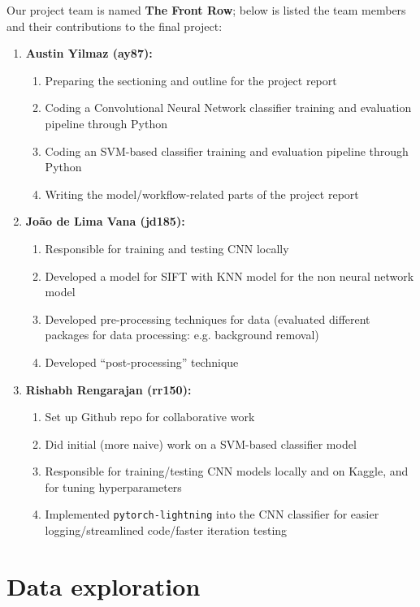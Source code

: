 \documentclass[10pt]{article} %
\begin{document}
Our project team is named \textbf{The Front Row}; below is listed the team members and their contributions to the final project:
\begin{enumerate}
  \item \textbf{Austin Yilmaz (ay87):}
    \begin{enumerate}
      \item Preparing the sectioning and outline for the project report
      \item Coding a Convolutional Neural Network classifier training and evaluation pipeline through Python
      \item Coding an SVM-based classifier training and evaluation pipeline through Python
      \item Writing the model/workflow-related parts of the project report
    \end{enumerate}
  \item \textbf{João de Lima Vana (jd185):}
    \begin{enumerate}
      \item Responsible for training and testing CNN locally
      \item Developed a model for SIFT with KNN model for the non neural network model
      \item Developed pre-processing techniques for data (evaluated different packages for data processing: e.g. background removal)
      \item Developed ``post-processing'' technique
    \end{enumerate}
  \item \textbf{Rishabh Rengarajan (rr150):}
    \begin{enumerate}
      \item Set up Github repo for collaborative work
      \item Did initial (more naive) work on a SVM-based classifier model
      \item Responsible for training/testing CNN models locally and on Kaggle, and for tuning hyperparameters
      \item Implemented \texttt{pytorch-lightning} into the CNN classifier for easier logging/streamlined code/faster iteration testing
    \end{enumerate}
\end{enumerate}

\section{Data exploration}
\end{document}
